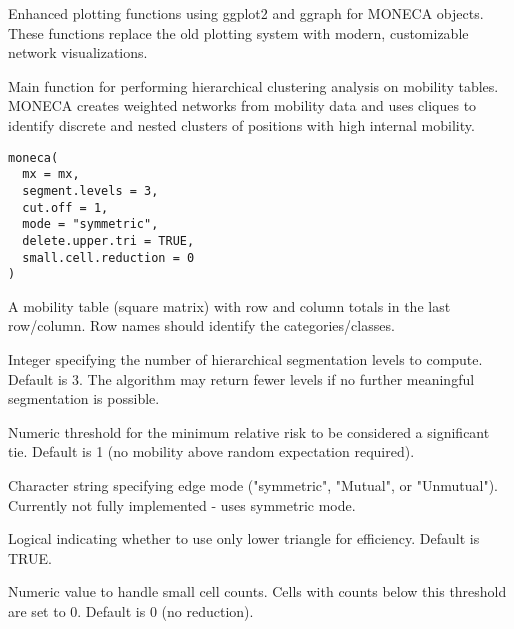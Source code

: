 \documentclass[a4paper]{book}
\begin{document}
%
\begin{Description}
Enhanced plotting functions using ggplot2 and ggraph for MONECA objects.
These functions replace the old plotting system with modern, customizable
network visualizations.
\end{Description}
%
\begin{Description}
Main function for performing hierarchical clustering analysis on mobility tables.
MONECA creates weighted networks from mobility data and uses cliques to identify
discrete and nested clusters of positions with high internal mobility.
\end{Description}
%
\begin{Usage}
\begin{verbatim}
moneca(
  mx = mx,
  segment.levels = 3,
  cut.off = 1,
  mode = "symmetric",
  delete.upper.tri = TRUE,
  small.cell.reduction = 0
)
\end{verbatim}
\end{Usage}
%
\begin{Arguments}
\begin{ldescription}
\item[\code{mx}] A mobility table (square matrix) with row and column totals in the last
row/column. Row names should identify the categories/classes.

\item[\code{segment.levels}] Integer specifying the number of hierarchical segmentation 
levels to compute. Default is 3. The algorithm may return fewer levels if no
further meaningful segmentation is possible.

\item[\code{cut.off}] Numeric threshold for the minimum relative risk to be considered
a significant tie. Default is 1 (no mobility above random expectation required).

\item[\code{mode}] Character string specifying edge mode ("symmetric", "Mutual", or 
"Unmutual"). Currently not fully implemented - uses symmetric mode.

\item[\code{delete.upper.tri}] Logical indicating whether to use only lower triangle 
for efficiency. Default is TRUE.

\item[\code{small.cell.reduction}] Numeric value to handle small cell counts. Cells with
counts below this threshold are set to 0. Default is 0 (no reduction).
\end{ldescription}
\end{Arguments}
\end{document}
